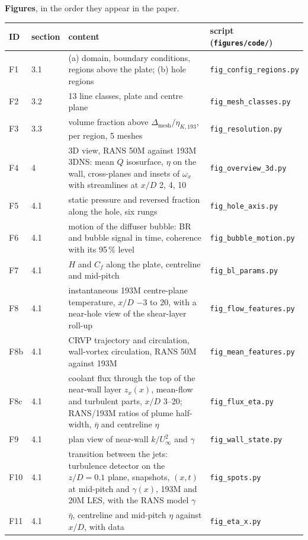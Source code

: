 \documentclass[10pt]{article}
\newcommand{\deta}{\Delta_{\mathrm{mesh}}/\eta_{K,193}}
\begin{document}
\textbf{Figures}, in the order they appear in the paper.\par
{\centering\footnotesize
\begin{tabularx}{\textwidth}{@{}l l X l@{}}
\toprule
ID & section & content & script (\texttt{figures/code/}) \\
\midrule
F1 & 3.1 & (a) domain, boundary conditions, regions above the plate; (b) hole regions & \texttt{fig\_config\_regions.py} \\
F2 & 3.2 & 13 line classes, plate and centre plane & \texttt{fig\_mesh\_classes.py} \\
F3 & 3.3 & volume fraction above $\deta$, per region, 5 meshes & \texttt{fig\_resolution.py} \\
F4 & 4 & 3D view, RANS 50M against 193M 3DNS: mean $Q$ isosurface, $\eta$ on the wall, cross-planes and insets of $\omega_x$ with streamlines at $x/D$ 2, 4, 10 & \texttt{fig\_overview\_3d.py} \\
F5 & 4.1 & static pressure and reversed fraction along the hole, six rungs & \texttt{fig\_hole\_axis.py} \\
F6 & 4.1 & motion of the diffuser bubble: BR and bubble signal in time, coherence with its 95\,\% level & \texttt{fig\_bubble\_motion.py} \\
F7 & 4.1 & $H$ and $C_f$ along the plate, centreline and mid-pitch & \texttt{fig\_bl\_params.py} \\
F8 & 4.1 & instantaneous 193M centre-plane temperature, $x/D$ $-3$ to 20, with a near-hole view of the shear-layer roll-up & \texttt{fig\_flow\_features.py} \\
F8b & 4.1 & CRVP trajectory and circulation, wall-vortex circulation, RANS 50M against 193M & \texttt{fig\_mean\_features.py} \\
F8c & 4.1 & coolant flux through the top of the near-wall layer $z_x(x)$, mean-flow and turbulent parts, $x/D$ 3--20; RANS/193M ratios of plume half-width, $\bar\eta$ and centreline $\eta$ & \texttt{fig\_flux\_eta.py} \\
F9 & 4.1 & plan view of near-wall $k/U_\infty^2$ and $\gamma$ & \texttt{fig\_wall\_state.py} \\
F10 & 4.1 & transition between the jets: turbulence detector on the $z/D=0.1$ plane, snapshots, $(x,t)$ at mid-pitch and $\gamma(x)$, 193M and 20M LES, with the RANS model $\gamma$ & \texttt{fig\_spots.py} \\
F11 & 4.1 & $\bar\eta$, centreline and mid-pitch $\eta$ against $x/D$, with data & \texttt{fig\_eta\_x.py} \\

\end{tabularx}}
\end{document}
